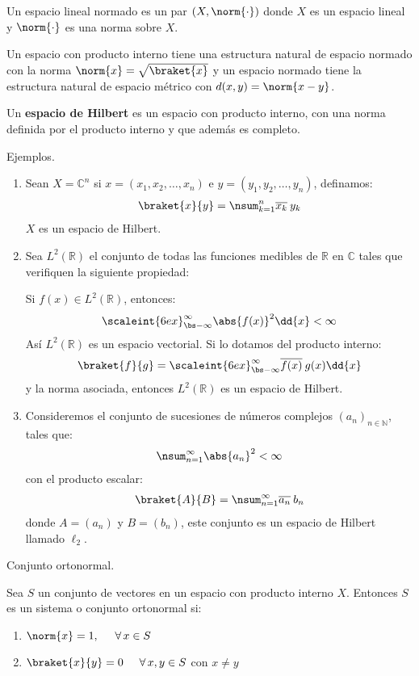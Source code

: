  Un espacio lineal normado es un par $(X, \norm{\cdot})$ donde $X$ es un espacio lineal y $\norm{\cdot}$ es una norma sobre $X$.
 \par
 Un espacio con producto interno tiene una estructura natural de espacio normado con la norma $\norm{x} = \sqrt{\braket{x}}$ y un espacio normado tiene la estructura natural de espacio métrico con $d(x, y) = \norm{x - y}$.

Un \textbf{espacio de Hilbert} es un espacio con producto interno, con una norma definida por el producto interno y que además es completo.
\par
Ejemplos.

\begin{enumerate}
\item Sean $X = \mathbb{C}^{n}$ si $x = (x_{1}, x_{2}, \ldots, x_{n})$ e $y = (y_{1}, y_{2}, \ldots, y_{n})$, definamos:
\begin{align*}
\braket{x}{y} = \nsum_{k=1}^{n} \overline{x_{k}} \: y_{k}
\end{align*}
$X$ es un espacio de Hilbert.
\item Sea $L^{2}(\mathbb{R})$ el conjunto de todas las funciones medibles de $\mathbb{R}$ en $\mathbb{C}$ tales que verifiquen la siguiente propiedad:

Si $f(x) \in L^{2}(\mathbb{R})$, entonces:
\begin{align*}
\scaleint{6ex}_{\bs -\infty}^{\infty} \abs{f(x)}^{2} \dd{x} < \infty
\end{align*}
Así $L^{2}(\mathbb{R})$ es un espacio vectorial. Si lo dotamos del producto interno:
\begin{align*}
\braket{f}{g} = \scaleint{6ex}_{\bs -\infty}^{\infty} \overline{f(x)} \: g(x) \dd{x}
\end{align*}
y la norma asociada, entonces $L^{2}(\mathbb{R})$ es un espacio de Hilbert.
\item Consideremos el conjunto de sucesiones de números complejos $(a_{n})_{n \in \mathbb{N}}$, tales que:
\begin{align*}
\nsum_{n=1}^{\infty} \abs{a_{n}}^{2} < \infty
\end{align*}
con el producto escalar:
\begin{align*}
\braket{A}{B} = \nsum_{n=1}^{\infty} \overline{a_{n}} \: b_{n}
\end{align*}
donde $A = (a_{n})$ y $B = (b_{n})$, este conjunto es un espacio de Hilbert llamado $\ell_{2}$.
\end{enumerate}

\begin{defi} Conjunto ortonormal.

Sea $S$ un conjunto de vectores en un espacio con producto interno $X$. Entonces $S$ es un sistema o conjunto ortonormal si:
\begin{enumerate}[label=\roman*.]
\item  $\norm{x} = 1, \hspace{0.5cm} \forall \, x \in S$
\item $\braket{x}{y} = 0 \hspace{0.5cm} \forall \, x, y \in S$ con $x \neq y$
\end{enumerate}
\end{defi}

